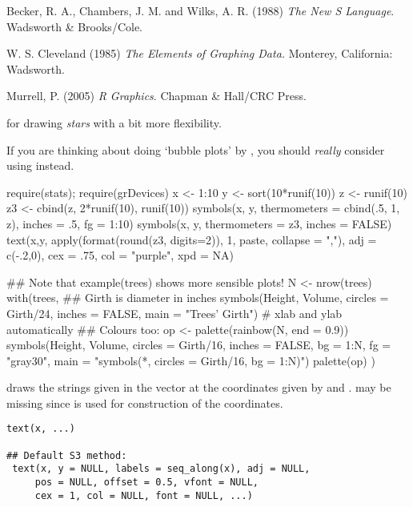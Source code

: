%
\begin{References}\relax
Becker, R. A., Chambers, J. M. and Wilks, A. R. (1988)
\emph{The New S Language}.
Wadsworth \& Brooks/Cole.

W. S. Cleveland (1985)
\emph{The Elements of Graphing Data.}
Monterey, California: Wadsworth.

Murrell, P. (2005) \emph{R Graphics}. Chapman \& Hall/CRC Press.
\end{References}
%
\begin{SeeAlso}\relax
{} for drawing \emph{stars} with a bit more
flexibility.

If you are thinking about doing `bubble plots' by
, you should \emph{really} consider using
 instead.
\end{SeeAlso}
%
\begin{Examples}
\begin{ExampleCode}
require(stats); require(grDevices)
x <- 1:10
y <- sort(10*runif(10))
z <- runif(10)
z3 <- cbind(z, 2*runif(10), runif(10))
symbols(x, y, thermometers = cbind(.5, 1, z), inches = .5, fg = 1:10)
symbols(x, y, thermometers = z3, inches = FALSE)
text(x,y, apply(format(round(z3, digits=2)), 1, paste, collapse = ","),
     adj = c(-.2,0), cex = .75, col = "purple", xpd = NA)

## Note that  example(trees)  shows more sensible plots!
N <- nrow(trees)
with(trees, {
## Girth is diameter in inches
symbols(Height, Volume, circles = Girth/24, inches = FALSE,
        main = "Trees' Girth") # xlab and ylab automatically
## Colours too:
op <- palette(rainbow(N, end = 0.9))
symbols(Height, Volume, circles = Girth/16, inches = FALSE, bg = 1:N,
        fg = "gray30", main = "symbols(*, circles = Girth/16, bg = 1:N)")
palette(op)
})
\end{ExampleCode}
\end{Examples}
%
\begin{Description}\relax
{} draws the strings given in the vector  at the
coordinates given by  and .
 may be missing since  is used for
construction of the coordinates.
\end{Description}
%
\begin{Usage}
\begin{verbatim}
text(x, ...)

## Default S3 method:
 text(x, y = NULL, labels = seq_along(x), adj = NULL,
     pos = NULL, offset = 0.5, vfont = NULL,
     cex = 1, col = NULL, font = NULL, ...)
\end{verbatim}
\end{Usage}

